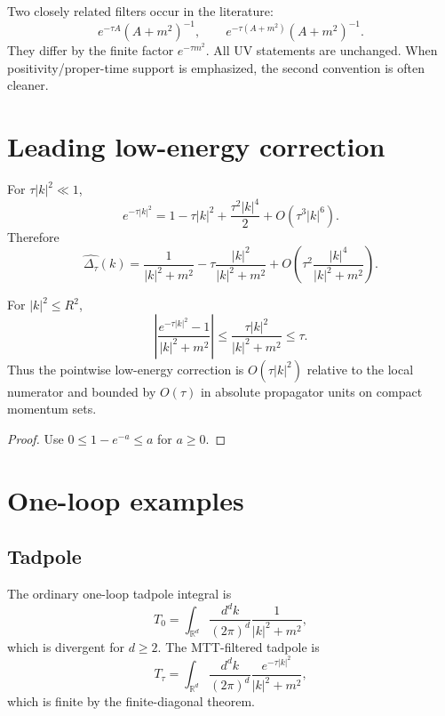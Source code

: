 \documentclass[11pt]{article}
\begin{document}
\begin{remark}
Two closely related filters occur in the literature:
\[
        e^{-\tau A}(A+m^2)^{-1},
        \qquad
        e^{-\tau(A+m^2)}(A+m^2)^{-1}.
\]
They differ by the finite factor \(e^{-\tau m^2}\). All UV statements are unchanged. When positivity/proper-time support is emphasized, the second convention is often cleaner.
\end{remark}

\section{Leading low-energy correction}

For \(\tau |k|^2\ll1\),
\[
        e^{-\tau |k|^2}
        =
        1-\tau |k|^2+\frac{\tau^2|k|^4}{2}+O(\tau^3|k|^6).
\]
Therefore
\[
        \widehat{\Delta_\tau}(k)
        =
        \frac{1}{|k|^2+m^2}
        -
        \tau \frac{|k|^2}{|k|^2+m^2}
        +
        O\!\left(\tau^2\frac{|k|^4}{|k|^2+m^2}\right).
\]

\begin{proposition}
For \(|k|^2\le R^2\),
\[
        \left|
        \frac{e^{-\tau |k|^2}-1}{|k|^2+m^2}
        \right|
        \le
        \frac{\tau |k|^2}{|k|^2+m^2}
        \le
        \tau .
\]
Thus the pointwise low-energy correction is \(O(\tau |k|^2)\) relative to the local numerator and bounded by \(O(\tau)\) in absolute propagator units on compact momentum sets.
\end{proposition}

\begin{proof}
Use \(0\le 1-e^{-a}\le a\) for \(a\ge0\).
\end{proof}

\section{One-loop examples}

\subsection{Tadpole}

The ordinary one-loop tadpole integral is
\[
        T_0
        =
        \int_{\mathbb R^d}
        \frac{d^dk}{(2\pi)^d}
        \frac{1}{|k|^2+m^2},
\]
which is divergent for \(d\ge2\). The MTT-filtered tadpole is
\[
        T_\tau
        =
        \int_{\mathbb R^d}
        \frac{d^dk}{(2\pi)^d}
        \frac{e^{-\tau |k|^2}}{|k|^2+m^2},
\]
which is finite by the finite-diagonal theorem.
\end{document}
